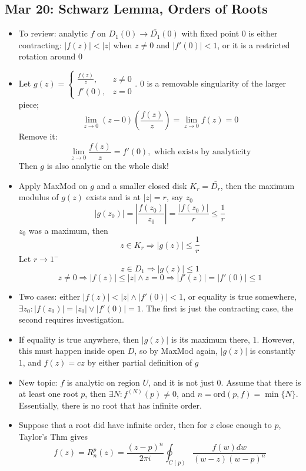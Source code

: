 \documentclass[10pt, oneside]{article}
\newcommand{\ltz}[1]{\lim_{#1 \rightarrow 0}}
\let\leq\leqslant
\begin{document}
\subsection{Mar 20: Schwarz Lemma, Orders of Roots}
\begin{itemize}
    \item To review: analytic $f$ on $D_1(0) \rightarrow \bar{D_1}(0)$ with fixed point $0$ is either contracting: $|f(z)| < |z|$ when $z \neq 0$ and $|f'(0)| < 1$, or it is a restricted rotation around $0$
    \item Let $g(z) = \begin{cases} \frac{f(z)}{z}, & z \neq 0 \\ f'(0), & z=0 \end{cases}$. $0$ is a removable singularity of the larger piece; 
            \[\ltz{z} (z-0)(\frac{f(z)}{z}) = \ltz{z} f(z) = 0\]
        Remove it:
            \[\ltz{z} \frac{f(z)}{z} = f'(0), \text{ which exists by analyticity}\]
        Then $g$ is also analytic on the whole disk!
    \item Apply MaxMod on $g$ and a smaller closed disk $K_r = \bar{D_r}$, then the maximum modulus of $g(z)$ exists and is at $|z| = r$, say $z_0$
            \[|g(z_0)| = \left|\frac{f(z_0)}{z_0}\right| = \frac{|f(z_0)|}{r} \leq \frac{1}{r}\]
        $z_0$ was a maximum, then
            \[z \in K_r \Rightarrow |g(z)| \leq \frac{1}{r}\]
        Let $r \rightarrow 1^-$
            \[z \in D_1 \Rightarrow |g(z)| \leq 1\]
            \[z \neq 0 \Rightarrow |f(z)| \leq |z| \land z = 0 \Rightarrow |f'(z)| = |f'(0)| \leq 1\]
    \item Two cases: either $|f(z)| < |z| \land |f'(0)| < 1$, or equality is true somewhere, $\exists z_0 : |f(z_0)| = |z_0| \lor |f'(0)| = 1$. The first is just the contracting case, the second requires investigation.
    \item If equality is true anywhere, then $|g(z)|$ is its maximum there, $1$. However, this must happen inside open $D$, so by MaxMod again, $|g(z)|$ is constantly  $1$, and $f(z) = cz$ by either partial definition of $g$
    \item New topic: $f$ is analytic on region $U$, and it is not just $0$. Assume that there is at least one root $p$, then $\exists N : f^{(N)}(p) \neq 0$, and $n = \text{ord}(p,f) = \min \{N\}$. Essentially, there is no root that has infinite order.
    \item Suppose that a root did have infinite order, then for $z$ close enough to $p$, Taylor's Thm gives 
            \[f(z) = R^p_n (z) = \frac{(z-p)^n}{2\pi i} \oint_{C(p)} \frac{f(w)dw}{(w-z)(w-p)^n}\]

\end{itemize}
\end{document}
